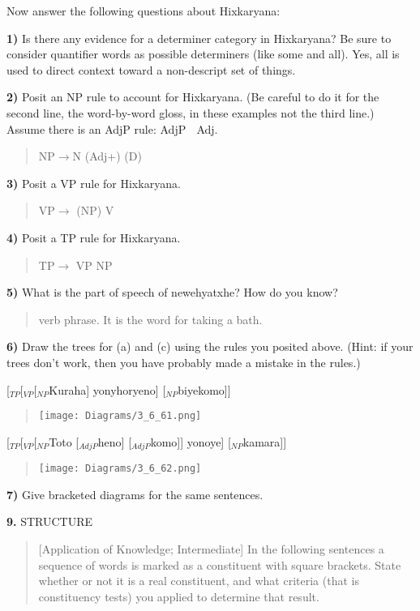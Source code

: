 \documentclass[11pt,notitlepage]{article}
\newcommand{\question}[2]{\textbf{#1.} #2}
\newcommand{\subquestion}[2]{\par\hspace{0.5cm} \textbf{#1)} #2}
\begin{document}
Now answer the following questions about Hixkaryana:

\subquestion{1}{Is there any evidence for a determiner category in
  Hixkaryana? Be sure to consider quantifier words as possible
  determiners (like some and all).}
Yes, all is used to direct context toward a non-descript set of things.

\subquestion{2}{Posit an NP rule to account for Hixkaryana. (Be careful to do it
  for the second line, the word-by-word gloss, in these examples not
  the third line.) Assume there is an AdjP rule: AdjP  Adj.}

\begin{quote}
  NP$\rightarrow$N (Adj+) (D)
\end{quote}

\subquestion{3}{Posit a VP rule for Hixkaryana.}

\begin{quote}
VP$\rightarrow$ (NP) V
\end{quote}

\subquestion{4}{Posit a TP rule for Hixkaryana.}

\begin{quote}
  TP$\rightarrow$ VP NP
\end{quote}

\subquestion{5}{What is the part of speech of newehyatxhe? How do you
  know?}

\begin{quote}
  verb phrase. It is the word for taking a bath. 
\end{quote}

\subquestion{6}{Draw the trees for (a) and (c) using the rules you posited above. (Hint: if
your trees don’t work, then you have probably made a mistake in the
rules.)}

[$_{TP}$[$_{VP}$[$_{NP}$Kuraha] yonyhoryeno] [$_{NP}$biyekomo]]

\begin{quote}
  \texttt{[image: Diagrams/3\_6\_61.png]}
\end{quote}

[$_{TP}$[$_{VP}$[$_{NP}$Toto [$_{AdjP}$heno] [$_{AdjP}$komo]] yonoye] [$_{NP}$kamara]]

\begin{quote}
\texttt{[image: Diagrams/3\_6\_62.png]}
\end{quote}

\subquestion{7}{Give bracketed diagrams for the same sentences.}

\question{9}{STRUCTURE}
\begin{quote}
[Application of Knowledge; Intermediate]
In the following sentences a sequence of words is marked as a
constituent with square brackets. State whether or not it is a real
constituent, and what criteria (that is constituency tests) you
applied to determine that result.
\end{quote}
\end{document}
